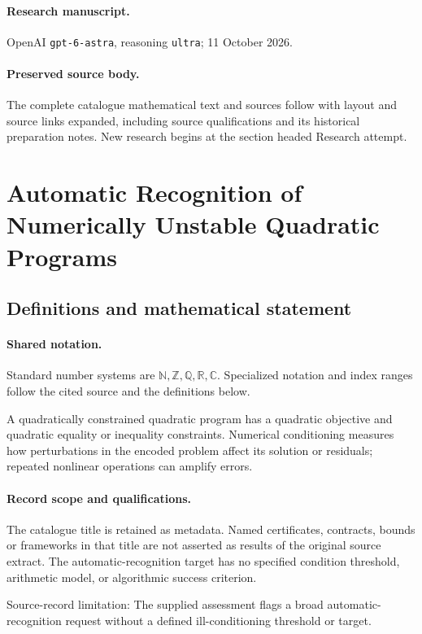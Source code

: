 \documentclass[11pt]{article}
\begin{document}
\paragraph{Research manuscript.} OpenAI \texttt{gpt-6-astra}, reasoning \texttt{ultra}; 11 October 2026.
\paragraph{Preserved source body.} The complete catalogue mathematical text and sources follow with layout and source links expanded, including source qualifications and its historical preparation notes. New research begins at the section headed Research attempt.

\section{Automatic Recognition of Numerically Unstable Quadratic Programs}\label{statement}

\subsection{Definitions and mathematical statement}

\paragraph{Shared notation.}Standard number systems are $\mathbb N,\mathbb Z,\mathbb Q,\mathbb R,\mathbb C$. Specialized notation and index ranges follow the cited source and the definitions below.


A quadratically constrained quadratic program has a quadratic objective and quadratic equality or inequality constraints. Numerical conditioning measures how perturbations in the encoded problem affect its solution or residuals; repeated nonlinear operations can amplify errors.
\paragraph{Record scope and qualifications.}
The catalogue title is retained as metadata. Named certificates, contracts, bounds or frameworks in that title are not asserted as results of the original source extract.
The automatic-recognition target has no specified condition threshold, arithmetic model, or algorithmic success criterion.

Source-record limitation: The supplied assessment flags a broad automatic-recognition request without a defined ill-conditioning threshold or target.
\end{document}
